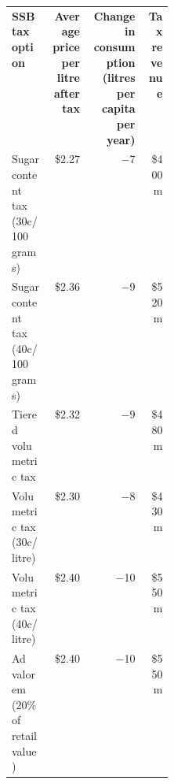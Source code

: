 \bgroup
\def\arraystretch{1.5}
\begin{tabularx}{\columnwidth}{p{0.24\linewidth}RRr}
\toprule
\textbf{SSB tax option} & \textbf{Average price per litre after~tax} & \textbf{Change in consumption (litres per capita per year)} & \textbf{Tax revenue} \\ \cmidrule(lr){1-4}
Sugar content tax (30c/100 grams) & \$2.27 & $-$7 & \$400m \\
Sugar content tax (40c/100 grams) & \$2.36 & $-$9 & \$520m \\
Tiered volumetric tax & \$2.32 & $-$9 & \$480m \\
Volumetric tax (30c/litre) & \$2.30 & $-$8 & \$430m \\
Volumetric tax (40c/litre) & \$2.40 & $-$10 & \$550m \\
Ad valorem (20\% of retail value) & \$2.40 & $-$10 & \$550m \\
\bottomrule
\end{tabularx}
\egroup